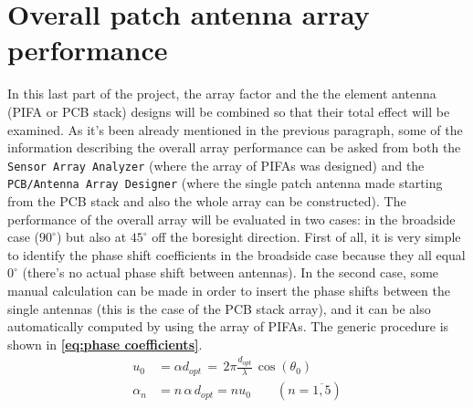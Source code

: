 \documentclass[12pt,a4paper]{article}
\begin{document}
{\section*{\selectfont\color{Turquoise}Overall patch antenna array performance}
In this last part of the project, the array factor and the the element antenna (PIFA or PCB stack) designs will be combined so that their total effect will be examined. As it's been already mentioned in the previous paragraph, some of the information describing the overall array performance can be asked from both the \texttt{\color{Mahogany}Sensor Array Analyzer} (where the array of PIFAs was designed) and the \texttt{\color{Mahogany}PCB/Antenna Array Designer} (where the single patch antenna made starting from the PCB stack and also the whole array can be constructed). The performance of the overall array will be evaluated in two cases: in the broadside case ($90^\circ$) but also at $45^\circ$ off the boresight direction. First of all, it is very simple to identify the phase shift coefficients in the broadside case because they all equal $0^\circ$ (there's no actual phase shift between antennas). In the second case, some manual calculation can be made in order to insert the phase shifts between the single antennas (this is the case of the PCB stack array), and it can be also automatically computed by using the array of PIFAs. The generic procedure is shown in \textbf{\cref{eq:phase coefficients}}. 
\begin{equation}
	\begin{aligned}
		u_0&=\alpha d_{opt}\,=\,2\pi\frac{d_{opt}}{\lambda}\,\cos(\theta_0)\\
		\alpha_n&=n\,\alpha\,d_{opt}=nu_0\qquad \left(n=\overline{1,5}\right)
		\label{eq:phase coefficients}
	\end{aligned}
\end{equation}
\indent 

}
\end{document}
